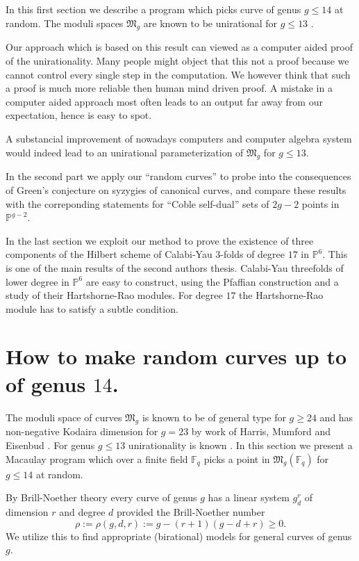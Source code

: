\documentclass[12pt,leqno]{amsart}
\newcommand{\FF}{{\mathbb F}}
\newcommand{\PP}{{\mathbb P}}
\newlength{\br}
\newlength{\ho}
\newcommand{\gM}{\mathfrak M}
\begin{document}
In this first section we describe a program which picks curve of genus
$g \le 14$ at random. The moduli spaces $\gM_g$ are known to be unirational
for $g\le 13$ \cite{Se,CR}. 

Our approach which is based on this result
can viewed as a computer aided proof of the unirationality. 
Many people might object 
that this not a proof because we cannot control every single step in the
computation. We however think that such a proof is much more reliable then
human mind driven proof.
A mistake in a computer aided approach most often leads to an output far 
away from our expectation, hence is easy to spot.  

A substancial
improvement of nowadays computers and computer algebra system would indeed
lead to an unirational parameterization of $\gM_g$ for $g\le 13$.
\medskip

In the second part we apply our ``random curves'' to probe into
the consequences of Green's conjecture on syzygies of canonical curves, 
and compare these results with the correponding statements for 
``Coble self-dual'' sets of $2g-2$ points in $\PP^{g-2}$. 
\medskip

In the last section we exploit our method to prove the existence of three
components of the Hilbert scheme of Calabi-Yau 3-folds of degree $17$ in 
$\PP^6$. This is one of the  main results of the second authors thesis. 
Calabi-Yau threefolds of lower degree in $\PP^6$ are easy to construct, 
using the Pfaffian construction and a study of their Hartshorne-Rao modules.
For degree $17$ the Hartshorne-Rao module has to satisfy a subtle condition. 

 



\section{How to make random curves up to of genus $14$.}

The moduli space of curves $\gM_g$ is known to be of general type for 
$g \ge 24$ and has non-negative Kodaira dimension for $g=23$ by work of 
Harris, Mumford and Eisenbud \cite{HM,EH}. 
For genus $g \le 13  $ unirationality is known \cite{CR,Se}.
In this section we present a Macaulay program which over a finite field $\FF_q$ 
picks a point in $\gM_g(\FF_q)$  for $g \le 14$ at random. 

By Brill-Noether theory \cite{ACGH} every curve of genus $g$ has a linear 
system $g^r_d$ of dimension $r$ and degree $d$ provided the Brill-Noether number
$$\rho := \rho(g,d,r) := g-(r+1)(g-d+r) \ge 0.$$
We utilize this to find appropriate (birational) models for general curves of genus $g$.
\end{document}
